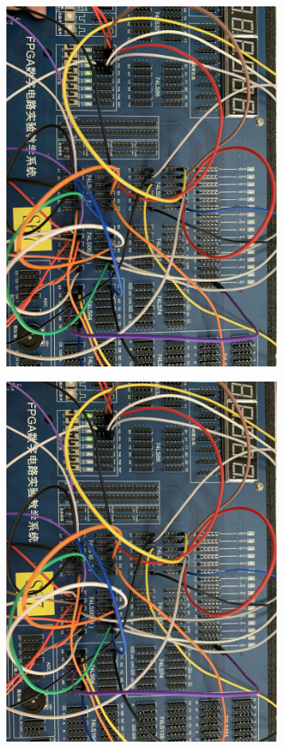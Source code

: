 \documentclass[UTF8, a4paper, 11pt]{article}
\begin{document}
\begin{figure}[H]
    \centering
    \includegraphics[width=0.8\textwidth]{1000.JPG}
\end{figure}
\begin{figure}[H]
    \centering
    \includegraphics[width=0.8\textwidth]{1001.JPG}
\end{figure}
\end{document}
